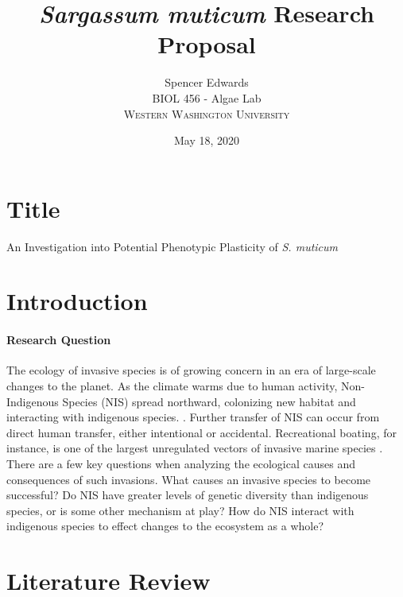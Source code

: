 \documentclass[12pt]{extarticle}
\title{\textit{Sargassum muticum} Research Proposal}
\author{Spencer Edwards \\
BIOL 456 - Algae Lab \\
\textsc{Western Washington University}}
\date{May 18, 2020}
\newcommand\x{\textit{S. muticum}}
\begin{document}
\maketitle
\section{Title}
An Investigation into Potential Phenotypic Plasticity of \x\

\section{Introduction}
\paragraph{Research Question}
The ecology of invasive species is of growing concern in an era of large-scale changes to the planet. As the climate warms due to human activity, Non-Indigenous Species (NIS) spread northward, colonizing new habitat and interacting with indigenous species. \cite{de2006northward}. Further transfer of NIS can occur from direct human transfer, either intentional or accidental. Recreational boating, for instance, is one of the largest unregulated vectors of invasive marine species \cite{Murray}. There are a few key questions when analyzing the ecological causes and consequences of such invasions. What causes an invasive species to become successful? Do NIS have greater levels of genetic diversity than indigenous species, or is some other mechanism at play? How do NIS interact with indigenous species to effect changes to the ecosystem as a whole?
\section{Literature Review}
\end{document}
